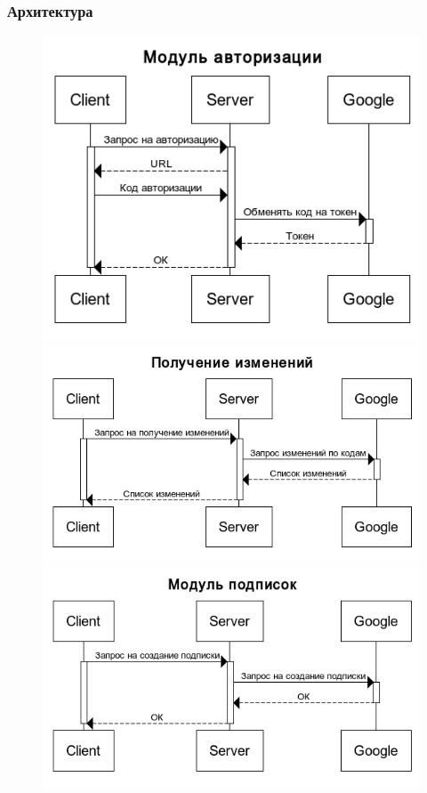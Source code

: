 \documentclass[10pt,pdf,hyperref={unicode}]{beamer}
\begin{document}
    \begin{frame}\frametitle{Архитектура}
    	\begin{figure}[ht] 
            \begin{minipage}[b]{0.5\linewidth}
                \centering
                \includegraphics[scale=0.3]{auth.png} 
            \end{minipage}%
            \begin{minipage}[b]{0.5\linewidth}
                \centering
	            \includegraphics[scale=0.3]{changes.png} 
            \end{minipage}
            \begin{minipage}[b]{0.5\linewidth}
    	        \centering
                \includegraphics[scale=0.3]{subscription.png} 

\end{minipage}
\end{figure}
\end{frame}
\end{document}

